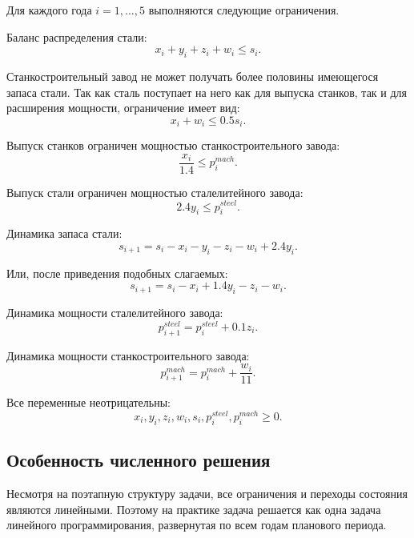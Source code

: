 \documentclass[a4paper,12pt]{article}
\begin{document}
Для каждого года $i = 1,\dots,5$ выполняются следующие ограничения.

Баланс распределения стали:
\begin{equation}
x_i + y_i + z_i + w_i \le s_i.
\end{equation}

Станкостроительный завод не может получать более половины имеющегося запаса
стали. Так как сталь поступает на него как для выпуска станков, так и для
расширения мощности, ограничение имеет вид:
\begin{equation}
x_i + w_i \le 0.5s_i.
\end{equation}

Выпуск станков ограничен мощностью станкостроительного завода:
\begin{equation}
\frac{x_i}{1.4} \le p_i^{mach}.
\end{equation}

Выпуск стали ограничен мощностью сталелитейного завода:
\begin{equation}
2.4y_i \le p_i^{steel}.
\end{equation}

Динамика запаса стали:
\begin{equation}
s_{i+1} = s_i - x_i - y_i - z_i - w_i + 2.4y_i.
\end{equation}

Или, после приведения подобных слагаемых:
\begin{equation}
s_{i+1} = s_i - x_i + 1.4y_i - z_i - w_i.
\end{equation}

Динамика мощности сталелитейного завода:
\begin{equation}
p_{i+1}^{steel} = p_i^{steel} + 0.1z_i.
\end{equation}

Динамика мощности станкостроительного завода:
\begin{equation}
p_{i+1}^{mach} = p_i^{mach} + \frac{w_i}{11}.
\end{equation}

Все переменные неотрицательны:
\begin{equation}
x_i, y_i, z_i, w_i, s_i, p_i^{steel}, p_i^{mach} \ge 0.
\end{equation}

\subsection{Особенность численного решения}

Несмотря на поэтапную структуру задачи, все ограничения и переходы состояния
являются линейными. Поэтому на практике задача решается как одна задача
линейного программирования, развернутая по всем годам планового периода.
\end{document}
